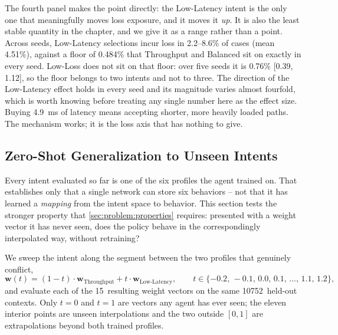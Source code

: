 The fourth panel makes the point directly: the Low-Latency intent is the only one that meaningfully moves
loss exposure, and it moves it \emph{up}. It is also the least stable quantity in the chapter, and we
give it as a range rather than a point. Across seeds, Low-Latency selections incur loss in
2.2--8.6\% of cases (mean 4.51\%), against a floor of 0.484\% that Throughput and Balanced sit on exactly
in every seed. Low-Loss does not sit on that floor: over
five seeds it is 0.76\% [0.39, 1.12], so the floor belongs to two intents and not to three.
The direction of the Low-Latency effect holds in
every seed and its magnitude varies almost fourfold, which is worth knowing before treating any single
number here as the effect size. Buying \SI{4.9}{\milli\second} of latency means accepting shorter, more
heavily loaded paths. The mechanism works; it is the loss axis that has nothing to give.

\subsection{Zero-Shot Generalization to Unseen Intents}
\label{sec:p1eval:zeroshot}

Every intent evaluated so far is one of the six profiles the agent trained on. That establishes only that
a single network can store six behaviors -- not that it has learned a \emph{mapping} from the intent
space to behavior. This section tests the stronger property that \cref{sec:problem:properties} requires:
presented with a weight vector it has never seen, does the policy behave in the correspondingly
interpolated way, without retraining?

We sweep the intent along the segment between the two profiles that genuinely conflict,
\begin{equation}
\mathbf{w}(t) = (1-t)\cdot\mathbf{w}_{\text{Throughput}} + t\cdot\mathbf{w}_{\text{Low-Latency}},
\qquad t \in \{-0.2,\, -0.1,\, 0.0,\, 0.1,\, \dots,\, 1.1,\, 1.2\},
\label{eq:p1interp}
\end{equation}
and evaluate each of the 15~resulting weight vectors on the same 10752~held-out contexts. Only $t = 0$
and $t = 1$ are vectors any agent has ever seen; the eleven interior points are unseen interpolations and
the two outside $[0,1]$ are extrapolations beyond both trained profiles.


